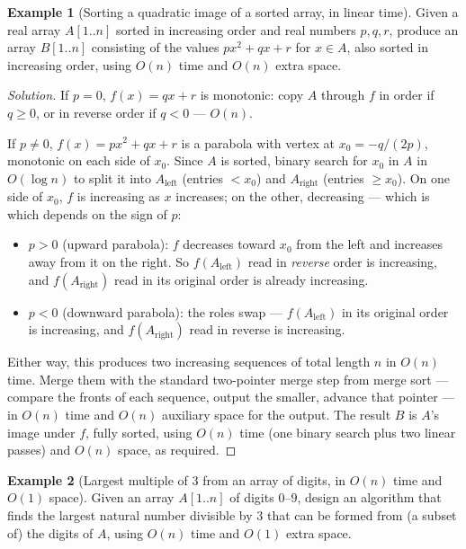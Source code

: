\documentclass[11pt]{article}
\theoremstyle{definition}
\newtheorem{example}{Example}[section]
\begin{document}
\begin{example}[Sorting a quadratic image of a sorted array, in linear time]
Given a real array $A[1..n]$ sorted in increasing order and real numbers $p,q,r$, produce an array $B[1..n]$ consisting of the values $px^2+qx+r$ for $x\in A$, also sorted in increasing order, using $O(n)$ time and $O(n)$ extra space.
\end{example}

\begin{proof}[Solution]
If $p=0$, $f(x)=qx+r$ is monotonic: copy $A$ through $f$ in order if $q\ge0$, or in reverse order if $q<0$ — $O(n)$.

If $p\neq0$, $f(x)=px^2+qx+r$ is a parabola with vertex at $x_0=-q/(2p)$, monotonic on each side of $x_0$. Since $A$ is sorted, binary search for $x_0$ in $A$ in $O(\log n)$ to split it into $A_{\text{left}}$ (entries $<x_0$) and $A_{\text{right}}$ (entries $\ge x_0$). On one side of $x_0$, $f$ is increasing as $x$ increases; on the other, decreasing — which is which depends on the sign of $p$:
\begin{itemize}
\item $p>0$ (upward parabola): $f$ decreases toward $x_0$ from the left and increases away from it on the right. So $f(A_{\text{left}})$ read in \emph{reverse} order is increasing, and $f(A_{\text{right}})$ read in its original order is already increasing.
\item $p<0$ (downward parabola): the roles swap — $f(A_{\text{left}})$ in its original order is increasing, and $f(A_{\text{right}})$ read in reverse is increasing.
\end{itemize}
Either way, this produces two increasing sequences of total length $n$ in $O(n)$ time. Merge them with the standard two-pointer merge step from merge sort — compare the fronts of each sequence, output the smaller, advance that pointer — in $O(n)$ time and $O(n)$ auxiliary space for the output. The result $B$ is $A$'s image under $f$, fully sorted, using $O(n)$ time (one binary search plus two linear passes) and $O(n)$ space, as required.
\end{proof}

\begin{example}[Largest multiple of $3$ from an array of digits, in $O(n)$ time and $O(1)$ space]
Given an array $A[1..n]$ of digits $0$–$9$, design an algorithm that finds the largest natural number divisible by $3$ that can be formed from (a subset of) the digits of $A$, using $O(n)$ time and $O(1)$ extra space.
\end{example}
\end{document}

